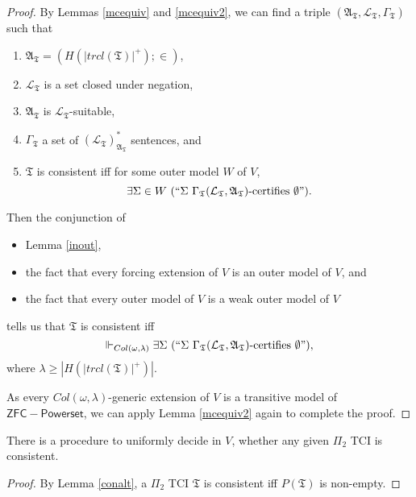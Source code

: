 \documentclass[12pt]{article}
\numberwithin{equation}{section}
\begin{document}
\begin{proof}
By Lemmas \ref{mcequiv} and \ref{mcequiv2}, we can find a triple $(\mathfrak{A}_{\mathfrak{T}}, \mathcal{L}_{\mathfrak{T}}, \Gamma_{\mathfrak{T}})$ such that 
\begin{enumerate}[label=(\alph*)]
    \item $\mathfrak{A}_{\mathfrak{T}} = (H(|trcl(\mathfrak{T})|^+); \in)$,
    \item $\mathcal{L}_{\mathfrak{T}}$ is a set closed under negation, 
    \item $\mathfrak{A}_{\mathfrak{T}}$ is $\mathcal{L}_{\mathfrak{T}}$-suitable, 
    \item $\Gamma_{\mathfrak{T}}$ a set of $({\mathcal{L}_{\mathfrak{T}}})^*_{\mathfrak{A}_{\mathfrak{T}}}$ sentences, and
    \item $\mathfrak{T}$ is consistent iff for some outer model $W$ of $V$, $$\exists \Sigma \in W \ (``\Sigma \ \Gamma_{\mathfrak{T}} (\mathcal{L}_{\mathfrak{T}}, \mathfrak{A}_{\mathfrak{T}})\text{-certifies } \emptyset").$$
\end{enumerate}
Then the conjunction of
\begin{itemize}
    \item Lemma \ref{inout},
    \item the fact that every forcing extension of $V$ is an outer model of $V$, and
    \item the fact that every outer model of $V$ is a weak outer model of $V$
\end{itemize}   
tells us that $\mathfrak{T}$ is consistent iff $$\Vdash_{Col(\omega, \lambda)} \exists \Sigma \ (``\Sigma \ \Gamma_{\mathfrak{T}} (\mathcal{L}_{\mathfrak{T}}, \mathfrak{A}_{\mathfrak{T}})\text{-certifies } \emptyset"),$$ where $\lambda \geq |H(|trcl(\mathfrak{T})|^+)|$. 

As every $Col(\omega, \lambda)$-generic extension of $V$ is a transitive model of $\mathsf{ZFC - Powerset}$, we can apply Lemma \ref{mcequiv2} again to complete the proof. 
\end{proof}

\begin{cor}\label{cor527}
There is a procedure to uniformly decide in $V$, whether any given $\Pi_2$ TCI is consistent.
\end{cor}

\begin{proof}
By Lemma \ref{conalt}, a $\Pi_2$ TCI $\mathfrak{T}$ is consistent iff $P(\mathfrak{T})$ is non-empty.
\end{proof} 
\end{document}

